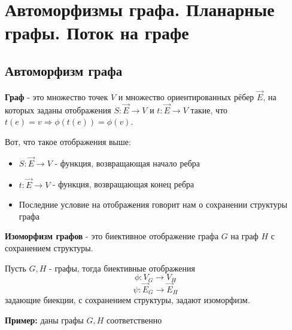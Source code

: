\section{Автоморфизмы графа. Планарные графы. Поток на графе}
\subsection{Автоморфизм графа}
\begin{definition}
    \textbf{Граф} - это множество точек $V$ и множество ориентированных
     рёбер $\overrightarrow{E}$,
    на которых заданы отображения $S:\overrightarrow{E} \rightarrow V$ и $t:\overrightarrow{E} \rightarrow V$ такие,
    что $t(e)=v \Rightarrow \phi(t(e)) = \phi(v)$.
\end{definition}
\begin{explanation*}
    Вот, что такое отображения выше:
    \begin{itemize}
        \item $S:\overrightarrow{E} \rightarrow V$ - функция, возвращающая
        начало ребра
        \item$t:\overrightarrow{E} \rightarrow V$ - функция, возвращающая конец ребра
        \item Последние условие на отображения говорит нам о сохранении структуры графа
    \end{itemize}
\end{explanation*}

\begin{definition}
    \textbf{Изоморфизм графов} - это биективное отображение графа $G$ на граф $H$ с сохранением
    структуры.
\end{definition}
\begin{explanation*}
    Пусть $G, H$ - графы, тогда биективные отображения
        $$\phi : V_{G} \rightarrow V_{H}$$
        $$\psi : \overrightarrow{E}_{G} \rightarrow \overrightarrow{E}_{H}$$
задающие биекции, с сохранением структуры, задают изоморфизм.
\end{explanation*}
\textbf{Пример:} даны графы $G, H$ соответственно

